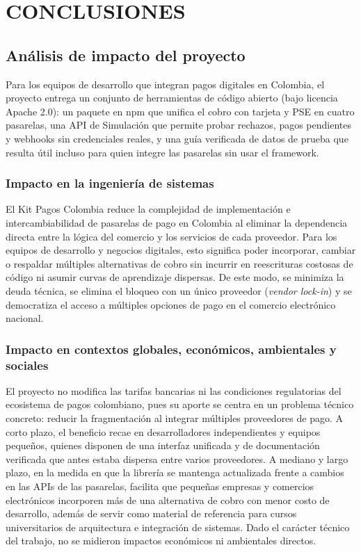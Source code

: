 \setcounter{subsection}{0}

\section{CONCLUSIONES}
\sloppy

\subsection{Análisis de impacto del proyecto}
Para los equipos de desarrollo que integran pagos digitales en Colombia, el proyecto entrega un conjunto de herramientas de código abierto (bajo licencia Apache 2.0): un paquete en npm que unifica el cobro con tarjeta y PSE en cuatro pasarelas, una API de Simulación que permite probar rechazos, pagos pendientes y webhooks sin credenciales reales, y una guía verificada de datos de prueba que resulta útil incluso para quien integre las pasarelas sin usar el framework.

\subsubsection{Impacto en la ingeniería de sistemas}
El Kit Pagos Colombia reduce la complejidad de implementación e intercambiabilidad de pasarelas de pago en Colombia al eliminar la dependencia directa entre la lógica del comercio y los servicios de cada proveedor. Para los equipos de desarrollo y negocios digitales, esto significa poder incorporar, cambiar o respaldar múltiples alternativas de cobro sin incurrir en reescrituras costosas de código ni asumir curvas de aprendizaje dispersas. De este modo, se minimiza la deuda técnica, se elimina el bloqueo con un único proveedor (\textit{vendor lock-in}) y se democratiza el acceso a múltiples opciones de pago en el comercio electrónico nacional.

\subsubsection{Impacto en contextos globales, económicos, ambientales y sociales}
El proyecto no modifica las tarifas bancarias ni las condiciones regulatorias del ecosistema de pagos colombiano, pues su aporte se centra en un problema técnico concreto: reducir la fragmentación al integrar múltiples proveedores de pago. A corto plazo, el beneficio recae en desarrolladores independientes y equipos pequeños, quienes disponen de una interfaz unificada y de documentación verificada que antes estaba dispersa entre varios proveedores. A mediano y largo plazo, en la medida en que la librería se mantenga actualizada frente a cambios en las APIs de las pasarelas, facilita que pequeñas empresas y comercios electrónicos incorporen más de una alternativa de cobro con menor costo de desarrollo, además de servir como material de referencia para cursos universitarios de arquitectura e integración de sistemas. Dado el carácter técnico del trabajo, no se midieron impactos económicos ni ambientales directos.

